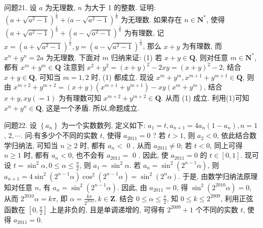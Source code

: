 问题21. 设 $a$ 为无理数, $n$ 为大于 1 的整数.
证明: $\left(a+\sqrt{a^2-1}\right)^{\frac{1}{n}}+(a- \left.\sqrt{a^2-1}\right)^{\frac{1}{n}}$ 为无理数.
如果存在 $n \in \mathbf{N}^*$, 使得 $\left(a+\sqrt{a^2-1}\right)^{\frac{1}{n}}+\left(a-\sqrt{a^2-1}\right)^{\frac{1}{n}}$ 为有理数, 记 $x=\left(a+\sqrt{a^2-1}\right)^{\frac{1}{n}}, y=\left(a-\sqrt{a^2-1}\right)^{\frac{1}{n}}$, 那么 $x+y$ 为有理数, 而 $x^n+y^n=2 a$ 为无理数.
下面对 $m$ 归纳来证: (1) 若 $x+y \in \mathbf{Q}$, 则对任意 $m \in \mathbf{N}^*$, 都有 $x^m+y^m \in \mathbf{Q}$ 
注意到 $x^2+y^2=(x+y)^2-2 x y=(x+y)^2-2$, 结合 $x+y \in \mathbf{Q}$, 可知当 $m=1,2$ 时, (1) 都成立.
现设 $x^m+y^m, x^{m+1}+y^{m+1} \in \mathbf{Q}$, 则由 $x^{m+2}+y^{m+2}= (x+y)\left(x^{m+1}+y^{m+1}\right)-x y\left(x^m+y^m\right)$, 结合 $x+y, x y(=1)$ 为有理数可知 $x^{m+2}+y^{m+2} \in \mathbf{Q}$. 从而 (1) 成立.
利用(1)可知 $x^n+y^n \in \mathbf{Q}$, 这是一个矛盾.
所以,命题成立.



问题22. 设 $\left\{a_n\right\}$ 为一个实数数列, 定义如下: $a_1=t, a_{n+1}=4 a_n\left(1-a_n\right), n=1$, $2, \cdots$. 问:有多少个不同的实数 $t$, 使得 $a_{2011}=0$ ?
若 $t>1$, 则 $a_2<0$, 依此结合数学归纳法, 可知当 $n \geqslant 2$ 时, 都有 $a_n<$ 0 , 从而 $a_{2011} \neq 0$; 若 $t<0$, 同上可得 $n \geqslant 1$ 时, 都有 $a_n<0$, 也不会有 $a_{2011}=$ 0 . 因此, 使 $a_{2011}=0$ 的 $t \in[0,1]$.
现可设 $t=\sin ^2 \alpha, 0 \leqslant \alpha \leqslant \frac{\pi}{2}$, 则 $a_1=\sin ^2 \alpha$. 若 $a_n=\sin ^2\left(2^{n-1} \alpha\right)$, 则 $a_{n+1}=4 \sin ^2\left(2^{n-1} \alpha\right) \cos ^2\left(2^{n-1} \alpha\right)=\sin ^2\left(2^n \alpha\right)$. 于是, 由数学归纳法原理知对任意 $n$, 有 $a_n=\sin ^2\left(2^{n-1} \alpha\right)$. 因此, 由 $a_{2011}=0$, 得 $\sin ^2\left(2^{2010} \alpha\right)=0$, 从而 $2^{2010} \alpha= k \pi$, 即 $\alpha=\frac{k \pi}{2^{2010}}, k \in \mathbf{Z}$. 结合 $0 \leqslant \alpha \leqslant \frac{\pi}{2}$, 知 $0 \leqslant k \leqslant 2^{2009}$, 利用正弦函数在 $\left[0, \frac{\pi}{2}\right]$ 上是非负的, 且是单调递增的, 可得有 $2^{2009}+1$ 个不同的实数 $t$, 使得 $a_{2011}=0$.



